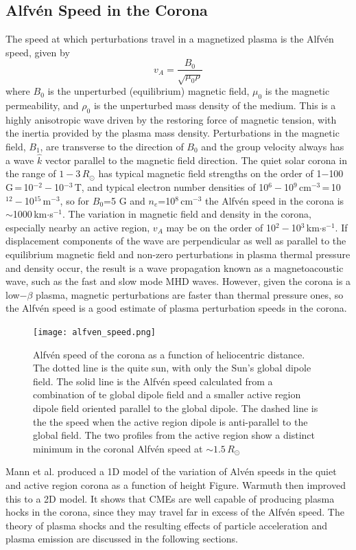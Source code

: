 \subsection{Alfv\'{e}n Speed in the Corona}
The speed at which perturbations travel in a magnetized plasma is the Alfv\'{e}n speed, given by
\begin{equation}
v_A = \frac{B_0}{\sqrt{\mu_0 \rho}}
\end{equation}
where $B_{0}$ is the unperturbed (equilibrium) magnetic field, $\mu_{0}$ is the magnetic permeability, and $\rho_{0}$ is the unperturbed mass density of the medium. This is a highly anisotropic wave driven by the restoring force of magnetic tension, with the inertia provided by the plasma mass density. Perturbations in the magnetic field, $B_{1}$, are transverse to the direction of $B_0$ and the group velocity always has a wave $\hat{k}$ vector parallel to the magnetic field direction. The quiet solar corona in the range of $1-3$\,$R_{\odot}$ has typical magnetic field strengths on the order of 1$-$100\,G\,=\,10$^{-2}-$10$^{-3}$\,T, and typical electron number densities of 10$^{6} -$10$^{9}$\,cm$^{-3}$\,=\,10$^{12}-$10$^{15}$\,m$^{-3}$, so for $B_0$=5 G and $n_e$=10$^{8}$\,cm$^{-3}$ the Alfv\'{e}n speed in the corona is $\sim$1000\,km$\cdot$s$^{-1}$. The variation in magnetic field and density in the corona, especially nearby an active region, $v_{A}$ may be on the order of 10$^{2}-$10$^{3}$\,km$\cdot$s$^{-1}$. If displacement components of the wave are perpendicular as well as parallel to the equilibrium magnetic field and non-zero perturbations in plasma thermal pressure and density occur, the result is a wave propagation known as a magnetoacoustic wave, such as the fast and slow mode MHD waves. However, given the corona is a low$-\beta$ plasma, magnetic perturbations are faster than thermal pressure ones, so the Alfv\'{e}n speed is a good estimate of plasma perturbation speeds in the corona.
\begin{figure}
\begin{center}
\texttt{[image: alfven\_speed.png]}
\caption[Model of the Aflv\'{e}n speed as a function of height in the corona]{Alfv\'{e}n speed of the corona as a function of heliocentric distance. The dotted line is the quite sun, with only the Sun's global dipole field. The solid line is the Alfv\'{e}n speed calculated from a combination of te global dipole field and a smaller active region dipole field oriented parallel to the global dipole. The dashed line is the the speed when the active region dipole is anti-parallel to the global field. The two profiles from the active region show a distinct minimum in the coronal Alfv\'{e}n speed at $\sim1.5\,R_{\odot}$}
\label{fig:alfven_speed}
\end{center}
\end{figure}
Mann et al. produced a 1D model of the variation of Alv\'{e}n speeds in the quiet and active region corona as a function of height Figure. Warmuth then improved this to a 2D model. It shows that CMEs are well capable of producing plasma hocks in the corona, since they may travel far in excess of the Alfv\'{e}n speed. The theory of plasma shocks and the resulting effects of particle acceleration and plasma emission are discussed in the following sections.


